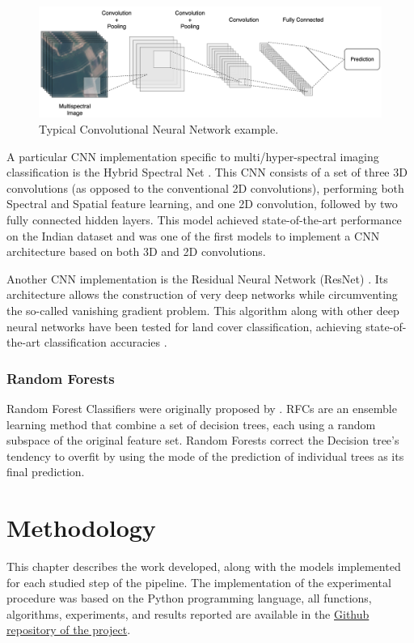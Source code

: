 \documentclass[12pt, english, openany]{book}
\begin{document}
\begin{figure}[H]
  \centering
  \includegraphics[width=1\linewidth]{cnn_example.png}
  \caption{Typical Convolutional Neural Network example.}
  \label{fig:cnn-example}
\end{figure}

A particular CNN implementation specific to multi/hyper-spectral imaging
classification is the Hybrid Spectral Net \cite{Roy2019}. This CNN
consists of a set of three 3D convolutions (as opposed to the conventional 2D
convolutions), performing both Spectral and Spatial feature learning, and one
2D convolution, followed by two fully connected hidden layers. This model
achieved state-of-the-art performance on the Indian dataset and was one of the
first models to implement a CNN architecture based on both 3D and 2D
convolutions.

Another CNN implementation is the Residual Neural Network (ResNet)
\cite{He2016}. Its architecture allows the construction of very deep
networks while circumventing the so-called vanishing gradient problem. This
algorithm along with other deep neural networks have been tested for land cover
classification, achieving state-of-the-art classification accuracies
\cite{Mahdianpari2018}.

\subsection*{Random Forests}

Random Forest Classifiers were originally proposed by \cite{Ho1995}.
RFCs are an ensemble learning method that combine a set of decision trees, each
using a random subspace of the original feature set. Random Forests correct the
Decision tree's tendency to overfit by using the mode of the prediction of
individual trees as its final prediction.

\chapter{Methodology}

This chapter describes the work developed, along with the models implemented
for each studied step of the pipeline. The implementation of the experimental
procedure was based on the Python programming language, all functions,
algorithms, experiments, and results reported are available in the
\href{https://github.com/joaopfonseca/remote_sensing}{Github repository of the project}.
\end{document}
